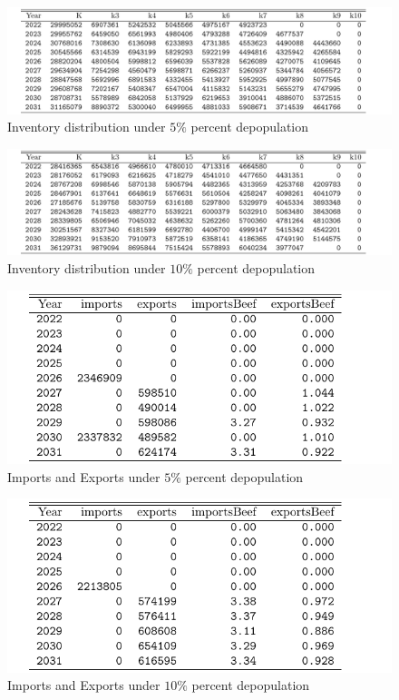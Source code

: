 \documentclass[
]{article}
\begin{document}
\begin{figure}
  \includegraphics[width=8in]{FMD-SimulationPlots/09-02/PES_INV_5.pdf}
  \caption{Inventory distribution under $5\%$ percent depopulation}
\end{figure}

\begin{figure}
  \includegraphics[width=8in]{FMD-SimulationPlots/09-02/PES_INV_10.pdf}
  \caption{Inventory distribution under $10\%$ percent depopulation}
\end{figure}

\begin{figure}
  \includegraphics[width=8in]{FMD-SimulationPlots/09-02/PES_TRADE_5.pdf}
  \caption{Imports and Exports under $5\%$ percent depopulation}
\end{figure}

\begin{figure}
  \includegraphics[width=8in]{FMD-SimulationPlots/09-02/PES_TRADE_10.pdf}
  \caption{Imports and Exports under $10\%$ percent depopulation}
\end{figure}
\end{document}
